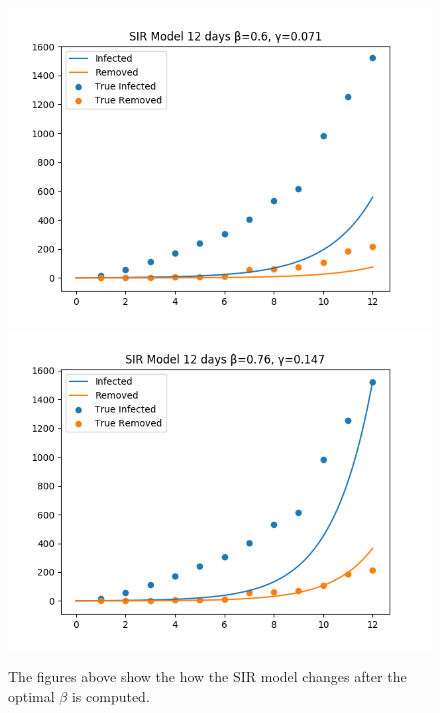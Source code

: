 \documentclass[]{article}
\begin{document}
\begin{figure}[h]
	\includegraphics[scale=0.5]{../Fig1.png}
	\\
	\includegraphics[scale=.5]{../Fig2.png}
	\caption{The figures above show the how the SIR model changes after the optimal $\beta$ is computed.}
\end{figure}
\end{document}

